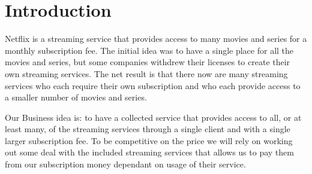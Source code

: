 \section{Introduction}
\label{sec:introduction}
Netflix is a streaming service that provides access to many movies and series for a monthly subscription fee. The initial idea was to have a single place for all the movies and series, but some companies withdrew their licenses to create their own streaming services. The net result is that there now are many streaming services who each require their own subscription and who each provide access to a smaller number of movies and series.

Our Business idea is: to have a collected service that provides access to all, or at least many, of the streaming services through a single client and with a single larger subscription fee. To be competitive on the price we will rely on working out some deal with the included streaming services that allows us to pay them from our subscription money dependant on usage of their service.